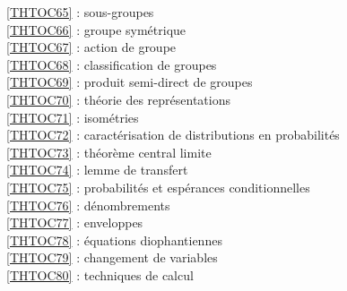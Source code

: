 \ref {THTOC65} : sous-groupes\\
\ref {THTOC66} : groupe symétrique\\
\ref {THTOC67} : action de groupe\\
\ref {THTOC68} : classification de groupes\\
\ref {THTOC69} : produit semi-direct de groupes\\
\ref {THTOC70} : théorie des représentations\\
\ref {THTOC71} : isométries\\
\ref {THTOC72} : caractérisation de distributions en probabilités\\
\ref {THTOC73} : théorème central limite\\
\ref {THTOC74} : lemme de transfert\\
\ref {THTOC75} : probabilités et espérances conditionnelles\\
\ref {THTOC76} : dénombrements\\
\ref {THTOC77} : enveloppes\\
\ref {THTOC78} : équations diophantiennes\\
\ref {THTOC79} : changement de variables\\
\ref {THTOC80} : techniques de calcul\\
